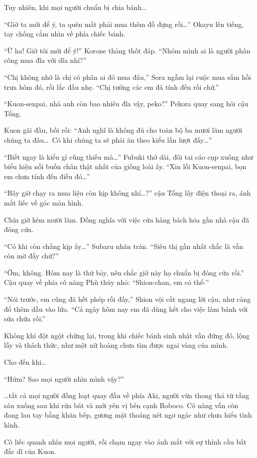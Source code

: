\documentclass[../main.tex]{subfiles}
\begin{document}
Tuy nhiên, khi mọi người chuẩn bị chia bánh\dots

``Giờ ta mới để ý, ta quên mất phải mua thêm đồ đựng rồi\dots'' Okayu lên tiếng, tay chống cằm nhìn về phía chiếc bánh.

``Ừ ha! Giờ tôi mới để ý!'' Korone thảng thốt đáp. ``Nhóm mình ai là người phân công mua đĩa với dĩa nhỉ?''

``Chị không nhớ là chị có phân ai đó mua đâu,'' Sora ngẫm lại cuộc mua sắm hồi trưa hôm đó, rồi lắc đầu nhẹ. ``Chị tưởng các em đã tính đến rồi chứ.''

``Kuon-senpai, nhà anh còn bao nhiêu đĩa vậy, peko?'' Pekora quay sang hỏi cậu Tổng.

Kuon gãi đầu, bối rối: ``Anh nghĩ là không đủ cho toàn bộ ba mươi lăm người chúng ta đâu\dots\ Có khi chúng ta sẽ phải ăn theo kiểu lần lượt đấy\dots''

``Biết ngay là kiểu gì cũng thiếu mà\dots'' Fubuki thở dài, đôi tai cáo cụp xuống như biểu hiện nỗi buồn chân thật nhất của giống loài ấy. ``Xin lỗi Kuon-senpai, bọn em chưa tính đến điều đó\dots''

``Bây giờ chạy ra mua liệu còn kịp không nhỉ\dots?'' cậu Tổng lấy điện thoại ra, ánh mắt liếc về góc màn hình.

Chín giờ kém mười lăm. Đồng nghĩa với việc cửa hàng bách hóa gần nhà cậu đã đóng cửa.

``Có khi còn chẳng kịp ấy\dots'' Subaru nhăn trán. ``Siêu thị gần nhất chắc là vẫn còn mờ đấy chứ?''

``Ờm, không. Hôm nay là thứ bảy, nên chắc giờ này họ chuẩn bị đóng cửa rồi.'' Cậu quay về phía cô nàng Phù thủy nhỏ: ``Shion-chan, em có thể-''

``Nói trước, em cũng đã hết phép rồi đấy,'' Shion vội cắt ngang lời cậu, như càng đổ thêm dầu vào lửa. ``Cả ngày hôm nay em đã dùng hết cho việc làm bánh với sửa chữa rồi.''

Không khí đột ngột chững lại, trong khi chiếc bánh sinh nhật vẫn đứng đó, lộng lẫy và thách thức, như một nữ hoàng chưa tìm được ngai vàng của mình.

Cho đến khi\dots

``Hửm? Sao mọi người nhìn mình vậy?''

\dots tất cả mọi người đồng loạt quay đầu về phía Aki, người vừa thong thả từ tầng sáu xuống sau khi rửa bát và mới yên vị bên cạnh Roboco. Cô nàng vẫn còn đang lau tay bằng khăn bếp, gương mặt thoáng nét ngơ ngác như chưa hiểu tình hình.

Cô liếc quanh nhìn mọi người, rồi chạm ngay vào ánh mắt với sự thỉnh cầu bất đắc dĩ của Kuon.
\end{document}
